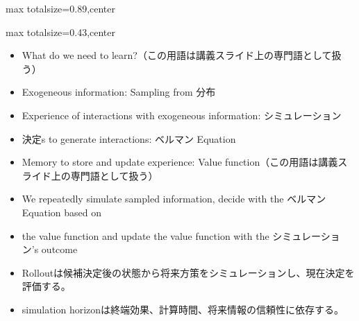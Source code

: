 \begin{minipage}[t]{0.58\textwidth}
\begin{adjustbox}{max totalsize={\textwidth}{0.89\textheight},center}
\begin{minipage}{\textwidth}
\end{minipage}
\end{adjustbox}
\end{minipage}


\clearpage
{}
\begin{minipage}[t]{0.405\textwidth}
\begin{adjustbox}{max totalsize={\textwidth}{0.43\textheight},center}
\begin{minipage}{\textwidth}\scriptsize
{}\begin{itemize}
\item What do we need to learn?（この用語は講義スライド上の専門語として扱う）
\item Exogeneous information: Sampling from 分布
\item Experience of interactions with exogeneous information: シミュレーション
\item 決定s to generate interactions: ベルマン Equation
\item Memory to store and update experience: Value function（この用語は講義スライド上の専門語として扱う）
\item We repeatedly simulate sampled information, decide with the ベルマン Equation based on
\item the value function and update the value function with the シミュレーション's outcome
\end{itemize}\begin{itemize}
\item Rolloutは候補決定後の状態から将来方策をシミュレーションし、現在決定を評価する。
\item simulation horizonは終端効果、計算時間、将来情報の信頼性に依存する。
\end{itemize}
\end{minipage}
\end{adjustbox}
\end{minipage}\hfill
